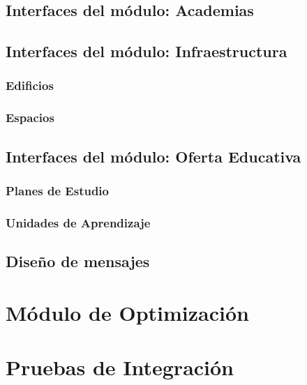 \documentclass[10pt]{book}
\begin{document}
\section{Interfaces del módulo: Academias}

\section{Interfaces del módulo: Infraestructura}
\subsection{Edificios}

\subsection{Espacios}

\section{Interfaces del módulo: Oferta Educativa}
\subsection{Planes de Estudio}

\subsection{Unidades de Aprendizaje}

\section{Diseño de mensajes}

\chapter{Módulo de Optimización}\label{chp:moduloOpt}

\chapter{Pruebas de Integración}\label{chp:pruebasIntegracion}
\end{document}
